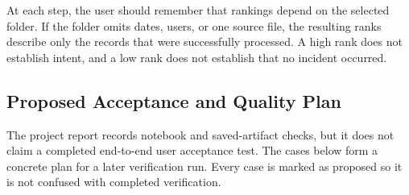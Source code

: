 At each step, the user should remember that rankings depend on the
selected folder. If the folder omits dates, users, or one source file,
the resulting ranks describe only the records that were successfully
processed. A high rank does not establish intent, and a low rank does
not establish that no incident occurred.

\subsection{Proposed Acceptance and Quality Plan}
The project report records notebook and saved-artifact checks, but it
does not claim a completed end-to-end user acceptance test. The cases
below form a concrete plan for a later verification run. Every case is
marked as proposed so it is not confused with completed verification.


